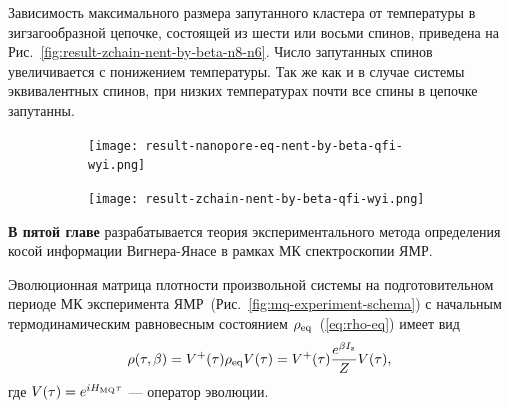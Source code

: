 Зависимость максимального размера запутанного кластера от температуры в зигзагообразной цепочке,
состоящей из шести или восьми спинов, приведена на Рис.~\ref{fig:result-zchain-nent-by-beta-n8-n6}.
Число запутанных спинов увеличивается с понижением температуры.
Так же как и в случае системы эквивалентных спинов,
при низких температурах почти все спины в цепочке запутанны.


\begin{figure}[H]
  \centering
  \begin{subfigure}[t]{0.49\textwidth}
    \texttt{[image: result-nanopore-eq-nent-by-beta-qfi-wyi.png]}
	\caption{}
	\label{fig:result-nanopore-eq-nent-by-beta-qfi-wyi}
  \end{subfigure}
  \hfill
  \begin{subfigure}[t]{0.49\textwidth}
    \texttt{[image: result-zchain-nent-by-beta-qfi-wyi.png]}
	\caption{}
	\label{fig:result-zchain-nent-by-beta-qfi-wyi}
  \end{subfigure}
  \caption{\protect}
  \label{fig:result-nent-by-beta-qfi-wyi}
\end{figure}

\textbf{В пятой главе} разрабатывается теория экспериментального метода определения косой информации Вигнера-Янасе в рамках МК спектроскопии ЯМР.

Эволюционная матрица плотности произвольной системы на
подготовительном периоде МК эксперимента ЯМР~(Рис.~\ref{fig:mq-experiment-schema})
с начальным термодинамическим равновесным состоянием $\rho_\mathrm{eq}$~(\ref{eq:rho-eq}) имеет вид
%
\begin{equation}\label{eq:rho-eval}
  \rho(\tau,\beta)
  = V^+(\tau) \rho_\mathrm{eq} V(\tau)
  = V^+(\tau) \frac{e^{\beta I_\mathrm{z}}}{Z} V(\tau),
\end{equation}
%
где $V(\tau) = e^{iH_\mathrm{MQ}\tau}$
---  оператор эволюции.

